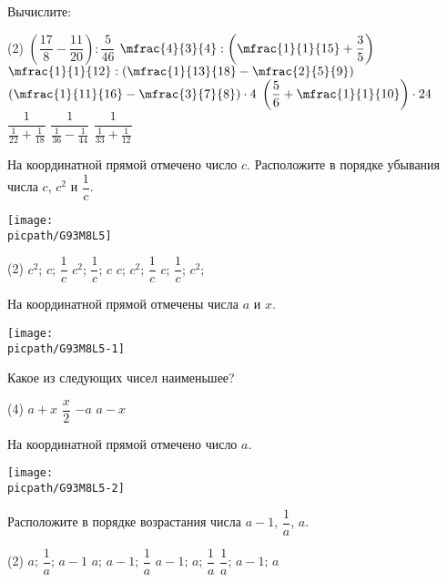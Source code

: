 \begin{class}[number=5]
	\begin{listofex}
		\item Вычислите:
		\begin{tasks}(2)
			\task \( \left( \dfrac{17}{8}-\dfrac{11}{20} \right):\dfrac{5}{46} \)
			\task \( \mfrac{4}{3}{4}:\left( \mfrac{1}{1}{15}+\dfrac{3}{5} \right) \)
			\task \( \mfrac{1}{1}{12}:\left( \mfrac{1}{13}{18}-\mfrac{2}{5}{9} \right) \)
			\task \( \left( \mfrac{1}{11}{16}-\mfrac{3}{7}{8} \right)\cdot4 \)
			\task \( \left( \dfrac{5}{6}+\mfrac{1}{1}{10} \right)\cdot24 \)
			\task \( \dfrac{1}{\frac{1}{22}+\frac{1}{18}} \)
			\task \( \dfrac{1}{\frac{1}{36}-\frac{1}{44}} \)
			\task \( \dfrac{1}{\frac{1}{33}+\frac{1}{12}} \)
		\end{tasks}
		\item На координатной прямой отмечено число \( c \). Расположите в порядке убывания числа \( c \), \( c^2 \) и \( \dfrac{1}{c} \). 
		\begin{center}
			\texttt{[image: \\picpath/G93M8L5]}
		\end{center}
	\begin{tasks}(2)
		\task \( c^2; \, c; \, \dfrac{1}{c} \)
		\task \( c^2; \, \dfrac{1}{c}; \, c \)
		\task \( c; \, c^2; \, \dfrac{1}{c} \)
		\task \( c; \, \dfrac{1}{c}; \, c^2;  \)
	\end{tasks}
		\item На координатной прямой отмечены числа \( a \) и \( x \).
		\begin{center}
			\texttt{[image: \\picpath/G93M8L5-1]}
		\end{center}
		Какое из следующих чисел наименьшее?
		\begin{tasks}(4)
			\task \( a+x \)
			\task \( \dfrac{x}{2} \)
			\task \( -a \)
			\task \( a-x \)
		\end{tasks}
		\item На координатной прямой отмечено число \( a \).
		\begin{center}
			\texttt{[image: \\picpath/G93M8L5-2]}
		\end{center}
		Расположите в порядке возрастания числа \( a-1 \), \( \dfrac{1}{a} \), \( a \). 
		\begin{tasks}(2)
			\task \( a; \, \dfrac{1}{a}; \, a-1 \)
			\task \( a; \, a-1; \, \dfrac{1}{a} \)
			\task \( a-1; \, a; \, \dfrac{1}{a} \)
			\task \( \dfrac{1}{a}; \, a-1; \, a\)

\end{tasks}
\end{listofex}
\end{class}

